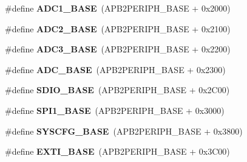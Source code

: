 \begin{DoxyCompactItemize}
\item 
\hypertarget{group___peripheral__memory__map_ga695c9a2f892363a1c942405c8d351b91}{\#define {\bfseries A\-D\-C1\-\_\-\-B\-A\-S\-E}~(A\-P\-B2\-P\-E\-R\-I\-P\-H\-\_\-\-B\-A\-S\-E + 0x2000)}\label{group___peripheral__memory__map_ga695c9a2f892363a1c942405c8d351b91}

\item 
\hypertarget{group___peripheral__memory__map_ga6544abc57f9759f610eee09a02442ae6}{\#define {\bfseries A\-D\-C2\-\_\-\-B\-A\-S\-E}~(A\-P\-B2\-P\-E\-R\-I\-P\-H\-\_\-\-B\-A\-S\-E + 0x2100)}\label{group___peripheral__memory__map_ga6544abc57f9759f610eee09a02442ae6}

\item 
\hypertarget{group___peripheral__memory__map_gaca766f86c8e0b00a8e2b0224dcbb4c82}{\#define {\bfseries A\-D\-C3\-\_\-\-B\-A\-S\-E}~(A\-P\-B2\-P\-E\-R\-I\-P\-H\-\_\-\-B\-A\-S\-E + 0x2200)}\label{group___peripheral__memory__map_gaca766f86c8e0b00a8e2b0224dcbb4c82}

\item 
\hypertarget{group___peripheral__memory__map_gad06cb9e5985bd216a376f26f22303cd6}{\#define {\bfseries A\-D\-C\-\_\-\-B\-A\-S\-E}~(A\-P\-B2\-P\-E\-R\-I\-P\-H\-\_\-\-B\-A\-S\-E + 0x2300)}\label{group___peripheral__memory__map_gad06cb9e5985bd216a376f26f22303cd6}

\item 
\hypertarget{group___peripheral__memory__map_ga95dd0abbc6767893b4b02935fa846f52}{\#define {\bfseries S\-D\-I\-O\-\_\-\-B\-A\-S\-E}~(A\-P\-B2\-P\-E\-R\-I\-P\-H\-\_\-\-B\-A\-S\-E + 0x2\-C00)}\label{group___peripheral__memory__map_ga95dd0abbc6767893b4b02935fa846f52}

\item 
\hypertarget{group___peripheral__memory__map_ga50cd8b47929f18b05efbd0f41253bf8d}{\#define {\bfseries S\-P\-I1\-\_\-\-B\-A\-S\-E}~(A\-P\-B2\-P\-E\-R\-I\-P\-H\-\_\-\-B\-A\-S\-E + 0x3000)}\label{group___peripheral__memory__map_ga50cd8b47929f18b05efbd0f41253bf8d}

\item 
\hypertarget{group___peripheral__memory__map_ga62246020bf3b34b6a4d8d0e84ec79d3d}{\#define {\bfseries S\-Y\-S\-C\-F\-G\-\_\-\-B\-A\-S\-E}~(A\-P\-B2\-P\-E\-R\-I\-P\-H\-\_\-\-B\-A\-S\-E + 0x3800)}\label{group___peripheral__memory__map_ga62246020bf3b34b6a4d8d0e84ec79d3d}

\item 
\hypertarget{group___peripheral__memory__map_ga87371508b3bcdcd98cd1ec629be29061}{\#define {\bfseries E\-X\-T\-I\-\_\-\-B\-A\-S\-E}~(A\-P\-B2\-P\-E\-R\-I\-P\-H\-\_\-\-B\-A\-S\-E + 0x3\-C00)}\label{group___peripheral__memory__map_ga87371508b3bcdcd98cd1ec629be29061}


\end{DoxyCompactItemize}
